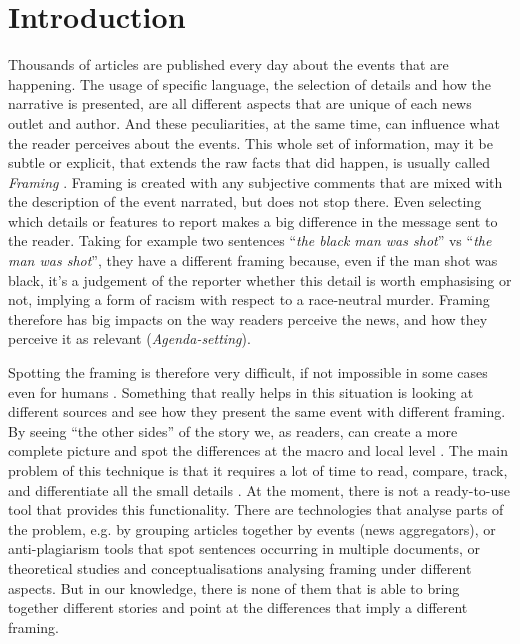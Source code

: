 \chapter{Introduction}


Thousands of articles are published every day about the events that are happening.
The usage of specific language, the selection of details and how the narrative is presented, are all different aspects that are unique of each news outlet and author.
And these peculiarities, at the same time, can influence what the reader perceives about the events.
This whole set of information, may it be subtle or explicit, that extends the raw facts that did happen, is usually called \emph{Framing} .
Framing is created with any subjective comments that are mixed with the description of the event narrated, but does not stop there.
Even selecting which details or features to report makes a big difference in the message sent to the reader.
Taking for example two sentences ``\textit{the black man was shot}'' vs ``\textit{the man was shot}'', they have a different framing because, even if the man shot was black, it's a judgement of the reporter whether this detail is worth emphasising or not, implying a form of racism with respect to a race-neutral murder.
Framing therefore has big impacts on the way readers perceive the news, and how they perceive it as relevant (\textit{Agenda-setting}).



Spotting the framing is therefore very difficult, if not impossible in some cases even for humans . Something that really helps  in this situation is looking at different sources and see how they present the same event with different framing.
By seeing ``the other sides'' of the story we, as readers, can  create a more complete picture and spot the differences at the macro and local level .
The main problem of this technique is that it requires a lot of time to read, compare, track, and differentiate all the small details .
At the moment, there is not  a ready-to-use tool that provides this functionality.
There are technologies that analyse parts of the problem, e.g. by grouping articles together by events (news aggregators), or anti-plagiarism tools that spot sentences occurring in multiple documents, or theoretical studies and conceptualisations analysing framing under different aspects.
But in our knowledge, there is none of them that is able to bring together different stories and point at the differences that imply a different framing.


